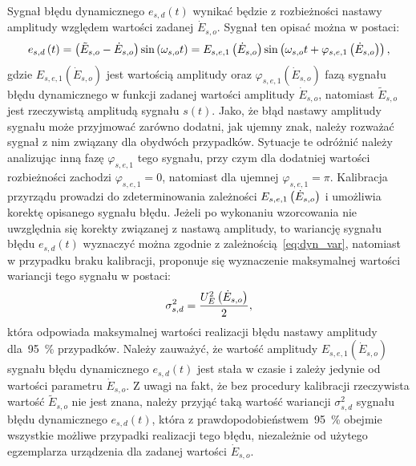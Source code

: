 Sygnał błędu dynamicznego $e_{s,d}(t)$ wynikać będzie z rozbieżności nastawy amplitudy względem wartości zadanej $\dot{E}_{s,o}$. Sygnał ten opisać można w postaci:
\begin{equation}
e_{s,d} \left(t\right) = \left(\tilde{E}_{s,o} - \dot{E}_{s,o}\right) \sin \left(\omega_{s,o} t\right) = E_{s,e,1} \left(\dot{E}_{s,o}\right) \sin \left(\omega_{s,o} t + \varphi_{s,e,1} \left(\dot{E}_{s,o}\right)\right) \label{eq:pom_gen_err_dyn_mono},
\end{equation}
gdzie $E_{s,e,1}(\dot{E}_{s,o})$ jest wartością amplitudy oraz $\varphi_{s,e,1}(\dot{E}_{s,o})$ fazą sygnału błędu dynamicznego w funkcji zadanej wartości amplitudy $\dot{E}_{s,o}$, natomiast $\tilde{E}_{s,o}$ jest rzeczywistą amplitudą sygnału $s(t)$. Jako, że błąd nastawy amplitudy sygnału może przyjmować zarówno dodatni, jak ujemny znak, należy rozważać sygnał z nim związany dla obydwóch przypadków. Sytuacje te odróżnić należy analizując inną fazę $\varphi_{s,e,1}$ tego sygnału, przy czym dla dodatniej wartości rozbieżności zachodzi $\varphi_{s,e,1} = 0$, natomiast dla ujemnej $\varphi_{s,e,1} = \pi$. Kalibracja przyrządu prowadzi do zdeterminowania zależności $E_{s,e,1} \left(\dot{E}_{s,o}\right)$ i umożliwia korektę opisanego sygnału błędu. Jeżeli po wykonaniu wzorcowania nie uwzględnia się korekty związanej z nastawą amplitudy, to wariancję sygnału błędu $e_{s,d}(t)$ wyznaczyć można zgodnie z zależnością~\eqref{eq:dyn_var}, natomiast w przypadku braku kalibracji, proponuje się wyznaczenie maksymalnej wartości wariancji tego sygnału w postaci:
\begin{equation}
\sigma_{s,d}^{2} = \frac{U_{E}^{2} \left(\dot{E}_{s,o}\right)}{2} \label{eq:pom_gen_var_dyn},
\end{equation}
która odpowiada maksymalnej wartości realizacji błędu nastawy amplitudy dla~\qty{95}{\percent} przypadków. Należy zauważyć, że wartość amplitudy $E_{s,e,1}(\dot{E}_{s,o})$ sygnału błędu dynamicznego $e_{s,d}(t)$ jest stała w czasie i zależy jedynie od wartości parametru $\dot{E}_{s,o}$. Z uwagi na fakt, że bez procedury kalibracji rzeczywista wartość $\tilde{E}_{s,o}$ nie jest znana, należy przyjąć taką wartość wariancji $\sigma_{s,d}^{2}$ sygnału błędu dynamicznego $e_{s,d}(t)$, która z prawdopodobieństwem~\qty{95}{\percent} obejmie wszystkie możliwe przypadki realizacji tego błędu, niezależnie od użytego egzemplarza urządzenia dla zadanej wartości $\dot{E}_{s,o}$.

